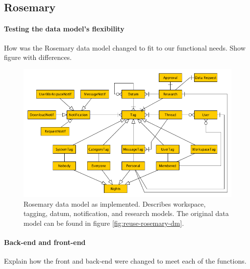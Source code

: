 \subsection{Rosemary}
\paragraph{Testing the data model's flexibility}
How was the Rosemary data model changed to fit to our functional needs.
Show figure with differences.

\begin{figure}[!htb]
	\centering
	\includegraphics[width=1.0\linewidth]{images/datamodel-adapted}
	\caption{
		Rosemary data model as implemented.
		Describes workspace, tagging, datum, notification, and research models.
		The original data model can be found in figure \ref{fig:reuse-rosemary-dm}.
	}
	\label{fig:implementation-rosemary-dm}
\end{figure}

\paragraph{Back-end and front-end}
Explain how the front and back-end were changed to meet each of the functions.